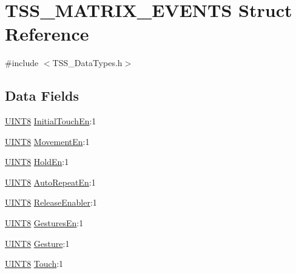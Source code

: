 \hypertarget{struct_t_s_s___m_a_t_r_i_x___e_v_e_n_t_s}{}\section{T\+S\+S\+\_\+\+M\+A\+T\+R\+I\+X\+\_\+\+E\+V\+E\+N\+TS Struct Reference}
\label{struct_t_s_s___m_a_t_r_i_x___e_v_e_n_t_s}


{\ttfamily \#include $<$T\+S\+S\+\_\+\+Data\+Types.\+h$>$}

\subsection*{Data Fields}
\begin{DoxyCompactItemize}
\item 
\hyperlink{_t_s_s___data_types_8h_ab27e9918b538ce9d8ca692479b375b6a}{U\+I\+N\+T8} \hyperlink{struct_t_s_s___m_a_t_r_i_x___e_v_e_n_t_s_af1478c480c5f9ff2589d8e687ad1ade4}{Initial\+Touch\+En}\+:1
\item 
\hyperlink{_t_s_s___data_types_8h_ab27e9918b538ce9d8ca692479b375b6a}{U\+I\+N\+T8} \hyperlink{struct_t_s_s___m_a_t_r_i_x___e_v_e_n_t_s_a7011ab8c0efec25677b2287c886370d0}{Movement\+En}\+:1
\item 
\hyperlink{_t_s_s___data_types_8h_ab27e9918b538ce9d8ca692479b375b6a}{U\+I\+N\+T8} \hyperlink{struct_t_s_s___m_a_t_r_i_x___e_v_e_n_t_s_a3cd1f8b7d5809d5a12f9a7d5b3b780e7}{Hold\+En}\+:1
\item 
\hyperlink{_t_s_s___data_types_8h_ab27e9918b538ce9d8ca692479b375b6a}{U\+I\+N\+T8} \hyperlink{struct_t_s_s___m_a_t_r_i_x___e_v_e_n_t_s_a714a49a3965b0bb1a5187fb6079f51e3}{Auto\+Repeat\+En}\+:1
\item 
\hyperlink{_t_s_s___data_types_8h_ab27e9918b538ce9d8ca692479b375b6a}{U\+I\+N\+T8} \hyperlink{struct_t_s_s___m_a_t_r_i_x___e_v_e_n_t_s_a7f5f3751fee0f5a199948ffb87697255}{Release\+Enabler}\+:1
\item 
\hyperlink{_t_s_s___data_types_8h_ab27e9918b538ce9d8ca692479b375b6a}{U\+I\+N\+T8} \hyperlink{struct_t_s_s___m_a_t_r_i_x___e_v_e_n_t_s_ae0bddb4851a870c39b454942a47878f6}{Gestures\+En}\+:1
\item 
\hyperlink{_t_s_s___data_types_8h_ab27e9918b538ce9d8ca692479b375b6a}{U\+I\+N\+T8} \hyperlink{struct_t_s_s___m_a_t_r_i_x___e_v_e_n_t_s_adf175bb3c9a58734b4dceb098f27841a}{Gesture}\+:1
\item 
\hyperlink{_t_s_s___data_types_8h_ab27e9918b538ce9d8ca692479b375b6a}{U\+I\+N\+T8} \hyperlink{struct_t_s_s___m_a_t_r_i_x___e_v_e_n_t_s_af14847cac91c6738b89713699d9b9c75}{Touch}\+:1
\end{DoxyCompactItemize}


